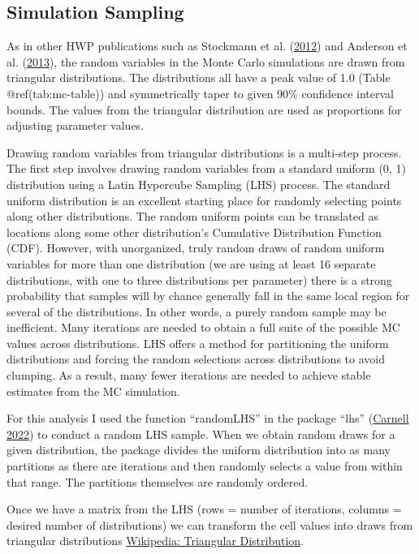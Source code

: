 \documentclass[
  openany]{book}
\begin{document}
\hypertarget{model-mc-samp}{%
\subsection{Simulation Sampling}\label{model-mc-samp}}

As in other HWP publications such as Stockmann et al.
(\protect\hyperlink{ref-stockmann2012}{2012}) and Anderson et al.
(\protect\hyperlink{ref-anderson2013}{2013}), the random variables in
the Monte Carlo simulations are drawn from triangular distributions. The
distributions all have a peak value of 1.0 (Table @ref(tab:mc-table))
and symmetrically taper to given 90\% confidence interval bounds. The
values from the triangular distribution are used as proportions for
adjusting parameter values.

Drawing random variables from triangular distributions is a multi-step
process. The first step involves drawing random variables from a
standard uniform (0, 1) distribution using a Latin Hypercube Sampling
(LHS) process. The standard uniform distribution is an excellent
starting place for randomly selecting points along other distributions.
The random uniform points can be translated as locations along some
other distribution's Cumulative Distribution Function (CDF). However,
with unorganized, truly random draws of random uniform variables for
more than one distribution (we are using at least 16 separate
distributions, with one to three distributions per parameter) there is a
strong probability that samples will by chance generally fall in the
same local region for several of the distributions. In other words, a
purely random sample may be inefficient. Many iterations are needed to
obtain a full suite of the possible MC values across distributions. LHS
offers a method for partitioning the uniform distributions and forcing
the random selections across distributions to avoid clumping. As a
result, many fewer iterations are needed to achieve stable estimates
from the MC simulation.

For this analysis I used the function ``randomLHS'' in the package
``lhs'' (\protect\hyperlink{ref-R-lhs}{Carnell 2022}) to conduct a
random LHS sample. When we obtain random draws for a given distribution,
the package divides the uniform distribution into as many partitions as
there are iterations and then randomly selects a value from within that
range. The partitions themselves are randomly ordered.

Once we have a matrix from the LHS (rows = number of iterations, columns
= desired number of distributions) we can transform the cell values into
draws from triangular distributions
\href{https://en.wikipedia.org/wiki/Triangular_distribution}{Wikipedia:
Triangular Distribution}.
\end{document}
